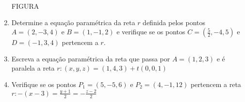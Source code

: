 \documentclass{article}
\begin{document}
\begin{enumerate}
FIGURA


\item Determine a equa\c{c}\~ao param\'etrica da reta $r$ definida pelos pontos $A = (2, -3, 4)$ e $B = (1, -1, 2)$ e verifique se os pontos $C = (\frac{5}{2}, -4, 5)$ e $D = (-1, 3, 4)$ pertencem a $r$.

\item Escreva a equa\c{c}\~ao param\'etrica da reta que passa por $A = (1, 2, 3)$ e \'e paralela a reta $r: (x, y, z) = (1, 4, 3) + t(0, 0, 1)$

\item Verifique se os pontos $P_1 = (5, -5, 6)$ e $P_2 = (4, -1, 12)$ pertencem a reta $\displaystyle r: -(x-3) = \frac{y+1}{2} = -\frac{z-2}{2}$




\end{enumerate}
\end{document}
